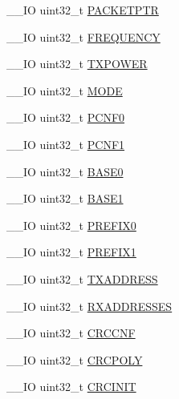 \begin{DoxyCompactItemize}
\item 
\+\_\+\+\_\+\+I\+O uint32\+\_\+t \hyperlink{struct_n_r_f___r_a_d_i_o___type_a547626c66c8b9a63aedf6dab3d6087a5}{P\+A\+C\+K\+E\+T\+P\+T\+R}
\item 
\+\_\+\+\_\+\+I\+O uint32\+\_\+t \hyperlink{struct_n_r_f___r_a_d_i_o___type_a901c02d72aef80d33d04baf35a77a642}{F\+R\+E\+Q\+U\+E\+N\+C\+Y}
\item 
\+\_\+\+\_\+\+I\+O uint32\+\_\+t \hyperlink{struct_n_r_f___r_a_d_i_o___type_a5bd623d57d99f7be1eabda6de3f90d4b}{T\+X\+P\+O\+W\+E\+R}
\item 
\+\_\+\+\_\+\+I\+O uint32\+\_\+t \hyperlink{struct_n_r_f___r_a_d_i_o___type_a97533349081d2095b08e4f806e90c6a0}{M\+O\+D\+E}
\item 
\+\_\+\+\_\+\+I\+O uint32\+\_\+t \hyperlink{struct_n_r_f___r_a_d_i_o___type_a11936c4f121789137feeea160bbe0f56}{P\+C\+N\+F0}
\item 
\+\_\+\+\_\+\+I\+O uint32\+\_\+t \hyperlink{struct_n_r_f___r_a_d_i_o___type_ade60939b3236c586d13407aaa628029f}{P\+C\+N\+F1}
\item 
\+\_\+\+\_\+\+I\+O uint32\+\_\+t \hyperlink{struct_n_r_f___r_a_d_i_o___type_a9149b02b27abc85e89c94ce0497c0878}{B\+A\+S\+E0}
\item 
\+\_\+\+\_\+\+I\+O uint32\+\_\+t \hyperlink{struct_n_r_f___r_a_d_i_o___type_a28dd58aec73dd60b82f51bfb30078a74}{B\+A\+S\+E1}
\item 
\+\_\+\+\_\+\+I\+O uint32\+\_\+t \hyperlink{struct_n_r_f___r_a_d_i_o___type_adedc3faf050cdbd911238b5fbb293fc7}{P\+R\+E\+F\+I\+X0}
\item 
\+\_\+\+\_\+\+I\+O uint32\+\_\+t \hyperlink{struct_n_r_f___r_a_d_i_o___type_a5e676c699f8afd91c47520832eb9bed4}{P\+R\+E\+F\+I\+X1}
\item 
\+\_\+\+\_\+\+I\+O uint32\+\_\+t \hyperlink{struct_n_r_f___r_a_d_i_o___type_a2769e68482b3b23d2af033f92737bbfa}{T\+X\+A\+D\+D\+R\+E\+S\+S}
\item 
\+\_\+\+\_\+\+I\+O uint32\+\_\+t \hyperlink{struct_n_r_f___r_a_d_i_o___type_a87d335f2275be03d04e6ca23fe7d64b7}{R\+X\+A\+D\+D\+R\+E\+S\+S\+E\+S}
\item 
\+\_\+\+\_\+\+I\+O uint32\+\_\+t \hyperlink{struct_n_r_f___r_a_d_i_o___type_a01a90c7f4644b9757af6db95de77387d}{C\+R\+C\+C\+N\+F}
\item 
\+\_\+\+\_\+\+I\+O uint32\+\_\+t \hyperlink{struct_n_r_f___r_a_d_i_o___type_aba89d571b108ffb395dd2400271167fb}{C\+R\+C\+P\+O\+L\+Y}
\item 
\+\_\+\+\_\+\+I\+O uint32\+\_\+t \hyperlink{struct_n_r_f___r_a_d_i_o___type_a53743615bbc51c77ca309c1a0ae9afaf}{C\+R\+C\+I\+N\+I\+T}

\end{DoxyCompactItemize}
